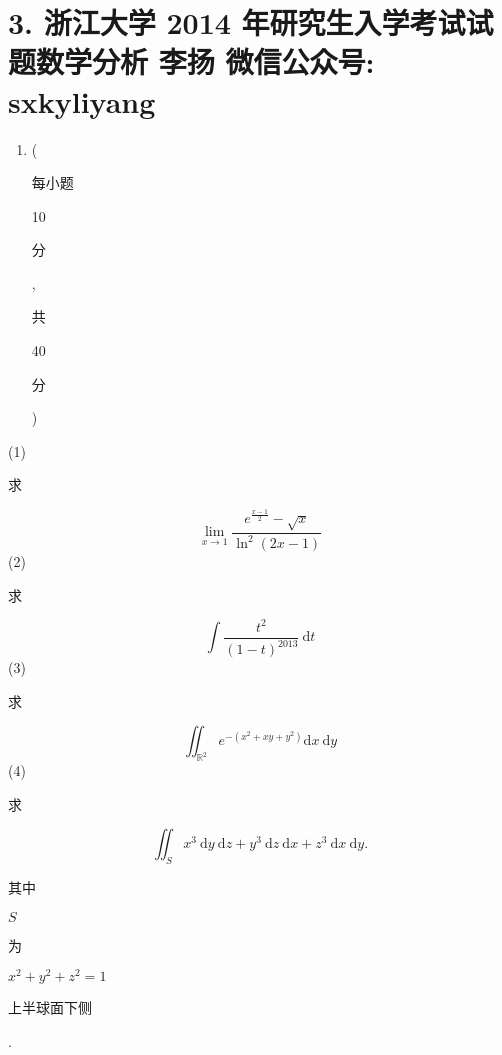 \documentclass[10pt]{article}
\begin{document}
\section{3. 浙江大学 2014 年研究生入学考试试题数学分析 
 李扬 
 微信公众号: sxkyliyang}
\begin{enumerate}
  \item (\begin{CJK}{UTF8}{mj}每小题\end{CJK} 10 \begin{CJK}{UTF8}{mj}分\end{CJK}, \begin{CJK}{UTF8}{mj}共\end{CJK} 40 \begin{CJK}{UTF8}{mj}分\end{CJK})
\end{enumerate}
(1) \begin{CJK}{UTF8}{mj}求\end{CJK}
$$
\lim _{x \rightarrow 1} \frac{e^{\frac{x-1}{2}}-\sqrt{x}}{\ln ^{2}(2 x-1)}
$$
(2) \begin{CJK}{UTF8}{mj}求\end{CJK}
$$
\int \frac{t^{2}}{(1-t)^{2013}} \mathrm{~d} t
$$
(3) \begin{CJK}{UTF8}{mj}求\end{CJK}
$$
\iint_{\mathbb{R}^{2}} e^{-\left(x^{2}+x y+y^{2}\right)} \mathrm{d} x \mathrm{~d} y
$$
(4) \begin{CJK}{UTF8}{mj}求\end{CJK}
$$
\iint_{S} x^{3} \mathrm{~d} y \mathrm{~d} z+y^{3} \mathrm{~d} z \mathrm{~d} x+z^{3} \mathrm{~d} x \mathrm{~d} y .
$$
\begin{CJK}{UTF8}{mj}其中\end{CJK} $S$ \begin{CJK}{UTF8}{mj}为\end{CJK} $x^{2}+y^{2}+z^{2}=1$ \begin{CJK}{UTF8}{mj}上半球面下侧\end{CJK}.
\end{document}
